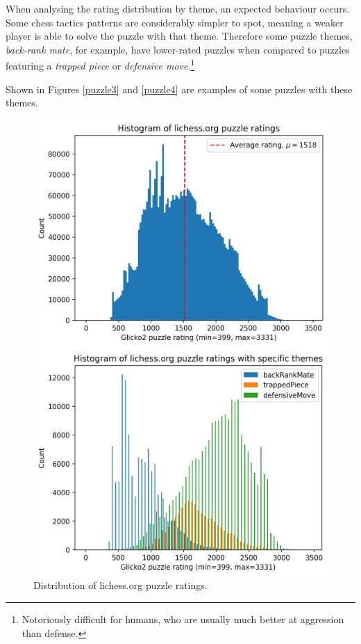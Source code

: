 When analysing the rating distribution by theme, an expected behaviour occurs.
Some chess tactics patterns are considerably simpler to spot, meaning a weaker
player is able to solve the puzzle with that theme. Therefore some puzzle
themes, \emph{back-rank mate}, for example, have lower-rated puzzles when
compared to puzzles featuring a \emph{trapped piece} or \emph{defensive
move}.\footnote{Notoriously difficult for humans, who are usually much better at
aggression than defense.}

Shown in Figures \ref{puzzle3} and \ref{puzzle4} are examples of some puzzles
with these themes.

\begin{figure}[H]
    \begin{minipage}{0.475\textwidth}
        \centering
        \includegraphics[width=\textwidth]{project/img/puzzle_histogram.png}
        \caption{Distribution of lichess.org puzzle ratings.}
        \label{dataHistogram}
    \end{minipage}
    \hspace{0.05\textwidth}
    \begin{minipage}{0.475\textwidth}
        \centering
        \includegraphics[width=\textwidth]{project/img/puzzle_theme_histograms.png}

\end{minipage}
\end{figure}
